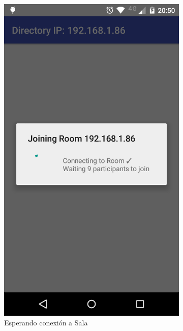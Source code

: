 {\begin{figure}[H]
    \centering
    \begin{subfigure}[b]{0.4\textwidth}
        \includegraphics[width=\textwidth]{imagenes/mobile_connecting.png}
        \caption{Esperando conexión a Sala}
        \label{fig:mobile_waiting}
    \end{subfigure}
    ~
    \begin{subfigure}[b]{0.4\textwidth}

\end{subfigure}
\end{figure}}
